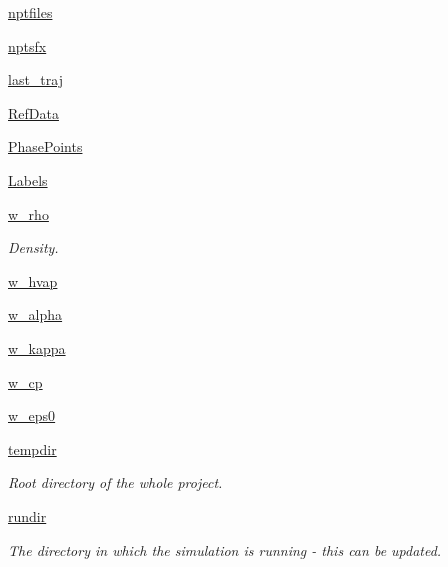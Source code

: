 \begin{DoxyCompactItemize}
\hyperlink{classforcebalance_1_1liquid_1_1Liquid_a2030a7e21fcce59155a0258daed4f2f7}{nptfiles}
\item 
\hyperlink{classforcebalance_1_1liquid_1_1Liquid_a4125a209929444b7cbfbd60b466dc763}{nptsfx}
\item 
\hyperlink{classforcebalance_1_1liquid_1_1Liquid_a95bb7b38b7638acba286718e55f783bb}{last\-\_\-traj}
\item 
\hyperlink{classforcebalance_1_1liquid_1_1Liquid_a472f32bbaf18b8ead19b9156f305b8fc}{Ref\-Data}
\item 
\hyperlink{classforcebalance_1_1liquid_1_1Liquid_a2c10490d9073a069bd19361f386422ef}{Phase\-Points}
\item 
\hyperlink{classforcebalance_1_1liquid_1_1Liquid_a50f976d2d3d6a1c261756035a26390e2}{Labels}
\item 
\hyperlink{classforcebalance_1_1liquid_1_1Liquid_aef8ad1dda086bde6f48130d273af9784}{w\-\_\-rho}
\begin{DoxyCompactList}\small\item\em Density. \end{DoxyCompactList}\item 
\hyperlink{classforcebalance_1_1liquid_1_1Liquid_abe985fe3aaa03d9f3a1b0a90f26b774d}{w\-\_\-hvap}
\item 
\hyperlink{classforcebalance_1_1liquid_1_1Liquid_a0d36d27d8c406b53bbb1096fbb76adbb}{w\-\_\-alpha}
\item 
\hyperlink{classforcebalance_1_1liquid_1_1Liquid_a6b262d9343247a902063bf62d5f19108}{w\-\_\-kappa}
\item 
\hyperlink{classforcebalance_1_1liquid_1_1Liquid_a3809c649d95ac6c9f662d599e6b1b93d}{w\-\_\-cp}
\item 
\hyperlink{classforcebalance_1_1liquid_1_1Liquid_a75ad3ea94ec845e91499f858e7be5f27}{w\-\_\-eps0}
\item 
\hyperlink{classforcebalance_1_1target_1_1Target_aa1f01b5b78db253b5b66384ed11ed193}{tempdir}
\begin{DoxyCompactList}\small\item\em Root directory of the whole project. \end{DoxyCompactList}\item 
\hyperlink{classforcebalance_1_1target_1_1Target_a6872de5b2d4273b82336ea5b0da29c9e}{rundir}
\begin{DoxyCompactList}\small\item\em The directory in which the simulation is running -\/ this can be updated. \end{DoxyCompactList}\item 

\end{DoxyCompactItemize}
